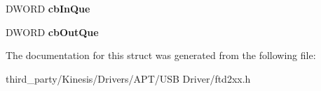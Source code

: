 \begin{DoxyCompactItemize}
\item 
D\+W\+O\+RD {\bfseries cb\+In\+Que}\hypertarget{struct___f_t_c_o_m_s_t_a_t_a995717c2425e3e52f046565bb60fbb3d}{}\label{struct___f_t_c_o_m_s_t_a_t_a995717c2425e3e52f046565bb60fbb3d}

\item 
D\+W\+O\+RD {\bfseries cb\+Out\+Que}\hypertarget{struct___f_t_c_o_m_s_t_a_t_ab0fbaa7889620e204d2f583b6e31f848}{}\label{struct___f_t_c_o_m_s_t_a_t_ab0fbaa7889620e204d2f583b6e31f848}

\end{DoxyCompactItemize}


The documentation for this struct was generated from the following file\+:\begin{DoxyCompactItemize}
\item 
third\+\_\+party/\+Kinesis/\+Drivers/\+A\+P\+T/\+U\+S\+B Driver/ftd2xx.\+h\end{DoxyCompactItemize}
